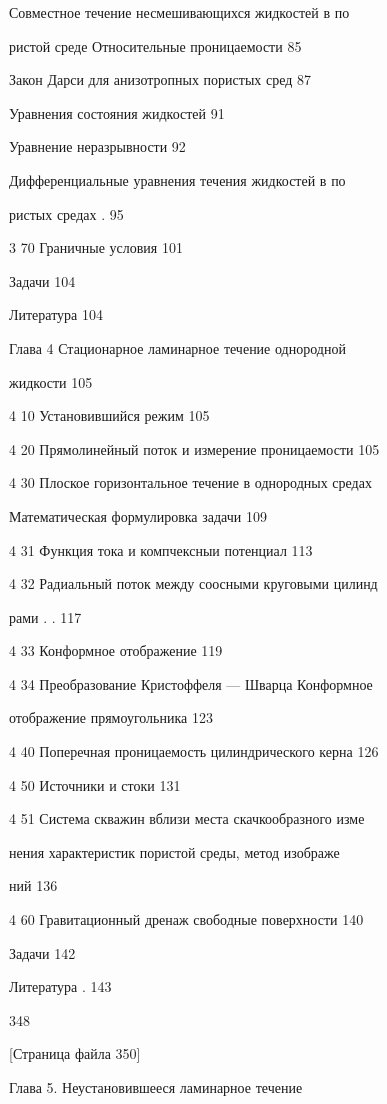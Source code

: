 \documentclass[
  11pt,
]{article}
\begin{document}
Совместное течение несмешивающихся жидкостей в по \par
ристой среде Относительные проницаемости 85 \par
Закон Дарси для анизотропных пористых сред 87 \par
Уравнения состояния жидкостей 91 \par
Уравнение неразрывности 92 \par
Дифференциальные уравнения течения жидкостей в по \par
ристых средах . 95 \par
3 70 Граничные условия 101 \par
Задачи 104 \par
Литература 104 \par
Глава 4 Стационарное ламинарное течение однородной \par
жидкости 105 \par
4 10 Установившийся режим 105 \par
4 20 Прямолинейный поток и измерение проницаемости 105 \par
4 30 Плоское горизонтальное течение в однородных средах \par
Математическая формулировка задачи 109 \par
4 31 Функция тока и компчексныи потенциал 113 \par
4 32 Радиальный поток между соосными круговыми цилинд \par
рами . . 117 \par
4 33 Конформное отображение 119 \par
4 34 Преобразование Кристоффеля --- Шварца Конформное \par
отображение прямоугольника 123 \par
4 40 Поперечная проницаемость цилиндрического керна 126 \par
4 50 Источники и стоки 131 \par
4 51 Система скважин вблизи места скачкообразного изме \par
нения характеристик пористой среды, метод изображе \par
ний 136 \par
4 60 Гравитационный дренаж свободные поверхности 140 \par
Задачи 142 \par
Литература . 143 \par
348 \par
\smallskip
\smallskip
\smallskip
{[}Страница файла 350{]}\par
Глава 5. Неустановившееся ламинарное течение  \par
\end{document}

